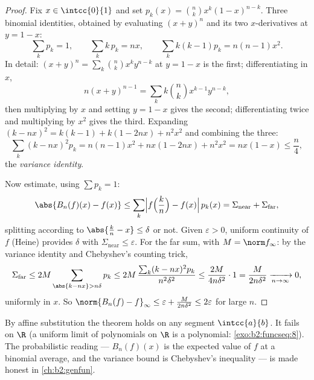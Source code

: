 \begin{proof}
Fix $x \in \intcc{0}{1}$ and set $p_k(x) = \binom nk x^k(1 -
x)^{n-k}$. Three binomial identities, obtained by evaluating
$(x + y)^n$ and its two $x$-derivatives at $y = 1 - x$:
\[
\sum_k p_k = 1,
\qquad
\sum_k k\,p_k = nx,
\qquad
\sum_k k(k-1) p_k = n(n-1)x^2 .
\]
In detail: $(x+y)^n = \sum_k\binom nk x^ky^{n-k}$ at $y = 1-x$
is the first; differentiating in $x$,
\[
n(x+y)^{n-1} = \sum_k k\binom nk x^{k-1}y^{n-k} ,
\]
then multiplying by $x$ and setting $y = 1 - x$ gives the
second; differentiating twice and multiplying by $x^2$ gives
the third. Expanding $(k - nx)^2 = k(k-1) + k(1 - 2nx) +
n^2x^2$ and combining the three:
\[
\sum_k (k - nx)^2 p_k
= n(n-1)x^2 + nx(1 - 2nx) + n^2x^2
= nx(1 - x) \leq \frac n4 ,
\]
the \emph{variance identity}.

Now estimate, using $\sum p_k = 1$:
\[
\abs{B_n(f)(x) - f(x)}
\leq \sum_{k} \Bigl| f\Bigl(\frac kn\Bigr) - f(x)\Bigr|\, p_k(x)
= \Sigma_{\text{near}} + \Sigma_{\text{far}} ,
\]
splitting according to $\abs{\frac kn - x} \leq \delta$ or not.
Given $\varepsilon > 0$, uniform continuity of $f$ (Heine) provides
$\delta$ with $\Sigma_{\text{near}} \leq \varepsilon$. For the far
sum, with $M = \norm f_\infty$: by the variance identity and
Chebyshev's counting trick,
\[
\Sigma_{\text{far}} \leq 2M \sum_{\abs{k - nx} > n\delta} p_k
\leq 2M\,\frac{\sum_k (k - nx)^2 p_k}{n^2\delta^2}
\leq \frac{2M}{4 n \delta^2} \cdot 1
= \frac{M}{2n\delta^2}
\xrightarrow[n\to\infty]{} 0 ,
\]
uniformly in $x$. So $\norm{B_n(f) - f}_\infty \leq \varepsilon +
\frac{M}{2n\delta^2} \leq 2\varepsilon$ for large $n$.
\end{proof}

\begin{remark}
By affine substitution the theorem holds on any segment
$\intcc{a}{b}$. It fails on $\R$ (a uniform limit of polynomials on
$\R$ is a polynomial: \cref{exo:b2:funcseq:8}). The probabilistic
reading --- $B_n(f)(x)$ is the expected value of $f$ at a binomial
average, and the variance bound is Chebyshev's inequality --- is
made honest in \cref{ch:b2:genfun}.
\end{remark}

